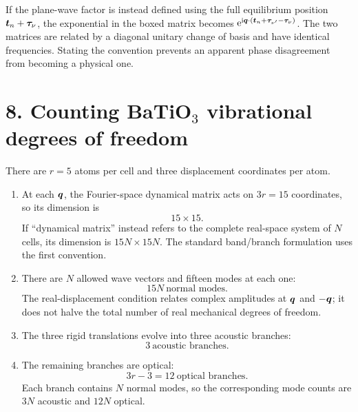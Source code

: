 If the plane-wave factor is instead defined using the full equilibrium position
$\boldsymbol{t}_n+\boldsymbol{\tau}_\nu$, the exponential in the boxed matrix becomes
$\mathrm{e}^{\mathrm{i}\boldsymbol{q}\cdot(\boldsymbol{t}_n+\boldsymbol{\tau}_{\nu'}-\boldsymbol{\tau}_\nu)}$.
The two matrices are related by a diagonal unitary change of basis and have identical frequencies. Stating the convention prevents an apparent phase disagreement from becoming a physical one.

\section*{8. Counting BaTiO$_3$ vibrational degrees of freedom}
There are $r=5$ atoms per cell and three displacement coordinates per atom.
\begin{enumerate}[label=(\alph*)]
\item At each $\boldsymbol{q}$, the Fourier-space dynamical matrix acts on $3r=15$ coordinates, so its dimension is
\[
\boxed{15\times15}.
\]
If ``dynamical matrix'' instead refers to the complete real-space system of $N$ cells, its dimension is $15N\times15N$. The standard band/branch formulation uses the first convention.
\item There are $N$ allowed wave vectors and fifteen modes at each one:
\[
\boxed{15N\ \text{normal modes}}.
\]
The real-displacement condition relates complex amplitudes at $\boldsymbol{q}$ and $-\boldsymbol{q}$; it does not halve the total number of real mechanical degrees of freedom.
\item The three rigid translations evolve into three acoustic branches:
\[
\boxed{3\ \text{acoustic branches}}.
\]
\item The remaining branches are optical:
\[
\boxed{3r-3=12\ \text{optical branches}}.
\]
Each branch contains $N$ normal modes, so the corresponding mode counts are $3N$ acoustic and $12N$ optical.
\end{enumerate}

